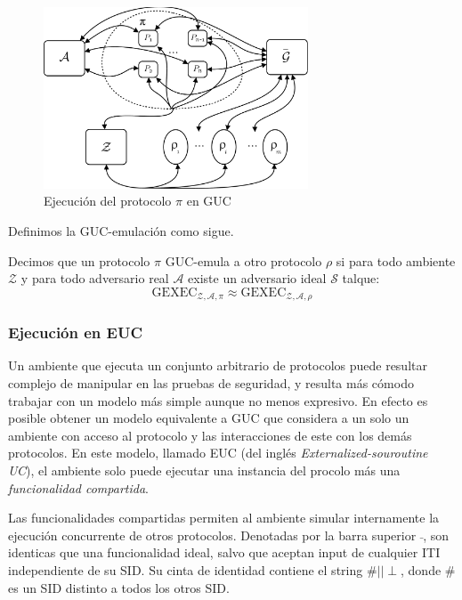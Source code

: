 \begin{figure}[hp]
    \centering
    \includegraphics[width=0.7\textwidth]{figs/mundo_real_guc}
    \caption{Ejecución del protocolo $\pi$ en GUC}
    \label{fig:mundo_real_guc}
\end{figure}

Definimos la GUC-emulación como sigue.

\begin{definicion}
Decimos que un protocolo $\pi$ GUC-emula a otro protocolo $\rho$ si para todo ambiente $\mathcal{Z}$
y para todo adversario real $\mathcal{A}$ existe un adversario ideal $\mathcal{S}$ talque:
$$\mathrm{GEXEC}_{\mathcal{Z}, \mathcal{A}, \mathcal{\pi}}
\approx
\mathrm{GEXEC}_{\mathcal{Z}, \mathcal{A}, \mathcal{\rho}}$$
\end{definicion}

\subsubsection{Ejecución en EUC}
Un ambiente que ejecuta un conjunto arbitrario de protocolos puede resultar complejo de manipular en las
pruebas de seguridad, y resulta más cómodo trabajar con un modelo más simple aunque no menos expresivo.
En efecto es posible obtener un modelo equivalente a GUC que considera a un  solo un ambiente  con acceso
al protocolo y las interacciones de este con los demás protocolos. En este modelo, llamado EUC (del inglés
\textit{Externalized-souroutine UC}), el ambiente solo puede ejecutar una instancia del procolo más una
\textit{funcionalidad compartida}.

Las funcionalidades compartidas permiten al ambiente simular internamente la ejecución concurrente de
otros protocolos. Denotadas por la barra superior $\bar{}$, son identicas que una funcionalidad
ideal, salvo que aceptan input de cualquier ITI independiente de su SID. Su cinta de identidad contiene
el string $\#||\perp$, donde $\#$ es un SID distinto a todos los otros SID.\\

